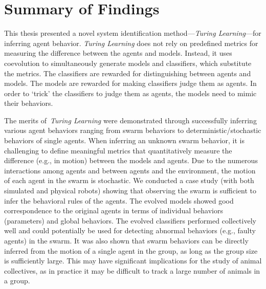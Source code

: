 \section{Summary of Findings}

This thesis presented a novel system identification method---\textit{Turing Learning}---for inferring agent behavior. \textit{Turing Learning} does not rely on predefined metrics for measuring the difference between the agents and models. Instead, it uses coevolution to simultaneously generate models and classifiers, which substitute the metrics. The classifiers are rewarded for distinguishing between agents and models. The models are rewarded for making classifiers judge them as agents. In order to `trick' the classifiers to judge them as agents, the models need to mimic their behaviors. 

The merits of~\textit{Turing Learning} were demonstrated through successfully inferring various agent behaviors ranging from swarm behaviors to deterministic/stochastic behaviors of single agents. When inferring an unknown swarm behavior, it is challenging to define meaningful metrics that quantitatively measure the difference (e.g., in motion) between the models and agents. Due to the numerous interactions among agents and between agents and the environment, the motion of each agent in the swarm is stochastic. We conducted a case study (with both simulated and physical robots) showing that observing the swarm is sufficient to infer the behavioral rules of the agents. The evolved models showed good correspondence to the original agents in terms of individual behaviors (parameters) and global behaviors. The evolved classifiers performed collectively well and could potentially be used for detecting abnormal behaviors (e.g., faulty agents) in the swarm. It was also shown that swarm behaviors can be directly inferred from the motion of a single agent in the group, as long as the group size is sufficiently large. This may have significant implications for the study of animal collectives, as in practice it may be difficult to track a large number of animals in a group. 

